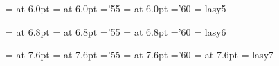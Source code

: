  \font\fivrm  = \textname at 6.0pt     	%
 \font\fivmi  = \mathitname at 6.0pt   	%
    \skewchar\fivmi ='55        	%
 \font\fivsy  = \mathsyname at 6.0pt 	%
    \skewchar\fivsy ='60         	%
 \font\fivly  = lasy5           	%

 \font\sixrm  = \textname at 6.8pt    	%
 \font\sixmi  = \mathitname at 6.8pt  	%
    \skewchar\sixmi ='55        	%
 \font\sixsy  = \mathsyname at 6.8pt   	%
    \skewchar\sixsy ='60         	%
 \font\sixly  = lasy6           	%

 \font\sevrm  = \textname at 7.6pt   	%
 \font\sevmi  = \mathitname at 7.6pt 	%
    \skewchar\sevmi ='55        	%
 \font\sevsy  = \mathsyname at 7.6pt 	%
    \skewchar\sevsy ='60         	%
 \font\sevit  = \italname at 7.6pt	%
 \font\sevly  = lasy7           	%

